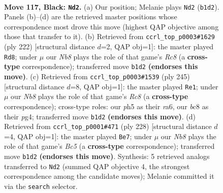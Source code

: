 \documentclass[11pt]{article}
\begin{document}
\clearpage

\begin{figure}[p]\centering
\begin{subfigure}{0.46\textwidth}\centering
\resizebox{\linewidth}{!}{%
\newchessgame
\chessboard[
  setfen={2B5/6k1/8/6PP/8/8/7K/1n6 b - - 4 117},
  showmover=false,
  pgfstyle=straightmove, color=movearrow, markmove={b1-d2}
]}
\caption{}
\end{subfigure}\hfill
\begin{subfigure}{0.46\textwidth}\centering
\resizebox{\linewidth}{!}{%
\newchessgame
\chessboard[
  setfen={2R5/8/6b1/4k3/8/5pp1/8/5K2 w - - 74 112},
  showmover=false,
  pgfstyle=straightmove, color=movearrow, markmove={c8-d8}
]}
\caption{}
\end{subfigure}
\\[4pt]
\begin{subfigure}{0.46\textwidth}\centering
\resizebox{\linewidth}{!}{%
\newchessgame
\chessboard[
  setfen={8/6k1/R7/6P1/6P1/8/6K1/2r5 b - - 20 123},
  showmover=false,
  pgfstyle=straightmove, color=movearrow, markmove={c1-e1}
]}
\caption{}
\end{subfigure}\hfill
\begin{subfigure}{0.46\textwidth}\centering
\resizebox{\linewidth}{!}{%
\newchessgame
\chessboard[
  setfen={8/8/6p1/2B5/4k1p1/2b5/6K1/8 w - - 62 115},
  showmover=false,
  pgfstyle=straightmove, color=movearrow, markmove={c5-e7}
]}
\caption{}
\end{subfigure}
\caption{\textbf{Move 117, Black: \texttt{Nd2}.} (a) Our position; Melanie plays \texttt{Nd2} (\texttt{b1d2}). Panels (b)--(d) are the retrieved master positions whose correspondence most drove this move (highest QAP objective among those that transfer to it). (b) Retrieved from \texttt{ccrl\_top\_p0003\#1629} (ply 222) [structural distance $d$=2, QAP obj=1]: the master played \texttt{Rd8}; under $\mu$ our \emph{Nb8} plays the role of that game's \emph{Rc8} (a \textbf{cross-type} correspondence); transferred move \texttt{b1d2} \textbf{(endorses this move)}. (c) Retrieved from \texttt{ccrl\_top\_p0003\#1539} (ply 245) [structural distance $d$=8, QAP obj=1]: the master played \texttt{Re1}; under $\mu$ our \emph{Nb8} plays the role of that game's \emph{Rc8} (a \textbf{cross-type} correspondence); cross-type roles: our \emph{p}h5 as their \emph{r}a6, our \emph{b}c8 as their \emph{p}g4; transferred move \texttt{b1d2} \textbf{(endorses this move)}. (d) Retrieved from \texttt{ccrl\_top\_p0001\#471} (ply 228) [structural distance $d$=4, QAP obj=1]: the master played \texttt{Be7}; under $\mu$ our \emph{Nb8} plays the role of that game's \emph{Bc5} (a \textbf{cross-type} correspondence); transferred move \texttt{b1d2} \textbf{(endorses this move)}. Synthesis: 5 retrieved analogs transferred to \texttt{Nd2} (summed QAP objective 4, the strongest correspondence among the candidate moves); Melanie committed it via the \texttt{search} selector.}
\label{fig:thought-m233}
\end{figure}
\end{document}
